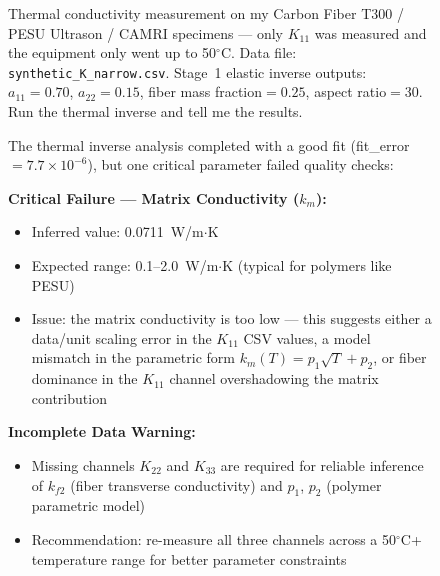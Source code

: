 \documentclass[preprint,review,10pt,number]{elsarticle}
\begin{document}
\begin{figure}[h]
\begin{tcolorbox}[
    colback=gray!5,
    colframe=black,
    boxrule=0.6pt,
    arc=2pt,
    left=8pt, right=8pt, top=6pt, bottom=6pt,
    title={\textbf{Prompt IK2} \hfill \textit{Narrow-range thermal input \& under-determinacy flagging}},
    fonttitle=\small
]
\begin{tcolorbox}[
    colback=gray!8,
    colframe=gray!60,
    boxrule=0.5pt,
    arc=2pt,
    left=6pt, right=6pt, top=4pt, bottom=4pt,
    title={\textbf{User}},
    fonttitle=\small\bfseries,
    coltitle=black
]
\small
Thermal conductivity measurement on my Carbon Fiber T300 / PESU 
Ultrason / CAMRI specimens --- only $K_{11}$ was measured and the 
equipment only went up to 50$^\circ$C. Data file: 
\texttt{synthetic\_K\_narrow.csv}. Stage~1 elastic inverse outputs: 
$a_{11}=0.70$, $a_{22}=0.15$, fiber mass fraction$=0.25$, aspect 
ratio$=30$. Run the thermal inverse and tell me the results.
\end{tcolorbox}
\vspace{6pt}
\begin{tcolorbox}[
    colback=gray!3,
    colframe=gray!40,
    boxrule=0.5pt,
    arc=2pt,
    left=6pt, right=6pt, top=4pt, bottom=4pt,
    title={\textbf{\texttt{MateriAl}}},
    fonttitle=\small\bfseries,
    coltitle=black
]
\small
The thermal inverse analysis completed with a good fit (fit\_error 
$= 7.7\times10^{-6}$), but one critical parameter failed quality 
checks:
\vspace{4pt}

\textbf{Critical Failure --- Matrix Conductivity ($k_m$):}
\begin{itemize}[leftmargin=1.2em, itemsep=0pt, topsep=2pt]
\item Inferred value: 0.0711~W/m$\cdot$K
\item Expected range: 0.1--2.0~W/m$\cdot$K (typical for polymers 
like PESU)
\item Issue: the matrix conductivity is too low --- this suggests 
either a data/unit scaling error in the $K_{11}$ CSV values, a 
model mismatch in the parametric form $k_m(T) = p_1\sqrt{T} + p_2$, 
or fiber dominance in the $K_{11}$ channel overshadowing the matrix 
contribution
\end{itemize}

\textbf{Incomplete Data Warning:}
\begin{itemize}[leftmargin=1.2em, itemsep=0pt, topsep=2pt]
\item Missing channels $K_{22}$ and $K_{33}$ are required for 
reliable inference of $k_{f2}$ (fiber transverse conductivity) and 
$p_1$, $p_2$ (polymer parametric model)
\item Recommendation: re-measure all three channels across a 
50$^\circ$C+ temperature range for better parameter constraints
\end{itemize}


\end{tcolorbox}
\end{tcolorbox}
\end{figure}
\end{document}
